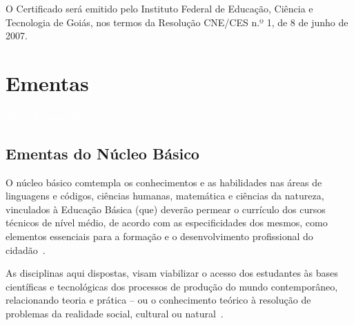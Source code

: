 \documentclass[11pt,fleqn]{book} %
\begin{document}
O Certificado será emitido pelo Instituto Federal de Educação, Ciência e Tecnologia de Goiás, nos termos da Resolução CNE/CES n.º 1, de 8 de junho de 2007.	


\chapter{Ementas}
\vspace{6em}
\begin{flushright}
	\textit{\textcolor{white}{Foto: Adriano Darosci}}
\end{flushright}
\vspace{12em}

\section{Ementas do Núcleo Básico}\label{ementasBasico}
\indent

O núcleo básico comtempla os conhecimentos e as habilidades nas áreas de linguagens e códigos, ciências humanas, matemática e ciências da natureza, vinculados à Educação Básica (que) deverão permear o currículo dos cursos técnicos de nível médio, de acordo com as especificidades dos mesmos, como elementos essenciais para a formação e o desenvolvimento profissional do cidadão~\cite{Resolucao06De2012}.

As disciplinas aqui dispostas, visam viabilizar o acesso dos estudantes às bases científicas e tecnológicas dos processos de produção do mundo contemporâneo, relacionando teoria e prática – ou o conhecimento teórico à resolução de problemas da realidade social, cultural ou natural~\cite{BNCC2019}.


\newpage
\end{document}
